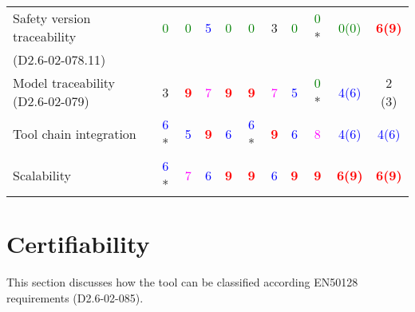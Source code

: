 \begin{tabular}{|l | c | c | c | c | c | c | c | c | c | c |}
\hline
Safety version traceability   & \textcolor{green}{0} & \textcolor{green}{0} & \textcolor{blue}{5} & \textcolor{green}{0} & \textcolor{green}{0} & 3     & \textcolor{green}{0} & \textcolor{green}{0} * & \textcolor{green}{0(0)}  & \textcolor{red}{\textbf{6(9)}}  \\
(D2.6-02-078.11) &  &      &  &  & & &  &    &   &   \\
\hline
Model traceability (D2.6-02-079) & 3     & \textcolor{red}{\textbf{9}} & \textcolor{magenta}{7} & \textcolor{red}{\textbf{9}} & \textcolor{red}{\textbf{9}} & \textcolor{magenta}{7} & \textcolor{blue}{5} & \textcolor{green}{0} * & \textcolor{blue}{4(6)}  & 2 (3) \\
\hline
Tool chain integration  & \textcolor{blue}{6} * & \textcolor{blue}{5} & \textcolor{red}{\textbf{9}} & \textcolor{blue}{6} & \textcolor{blue}{6} * & \textcolor{red}{\textbf{9}} & \textcolor{blue}{6} & \textcolor{magenta}{8} & \textcolor{blue}{4(6)}  & \textcolor{blue}{4(6)}  \\
\hline
Scalability  & \textcolor{blue}{6} * & \textcolor{magenta}{7} & \textcolor{blue}{6} & \textcolor{red}{\textbf{9}} & \textcolor{red}{\textbf{9}} & \textcolor{blue}{6} & \textcolor{red}{\textbf{9}} & \textcolor{red}{\textbf{9}} & \textcolor{red}{\textbf{6(9)}}  & \textcolor{red}{\textbf{6(9)}}  \\
\hline
\end{tabular}

\section{Certifiability}

This section discusses how the tool can be classified according EN50128 requirements (D2.6-02-085).



